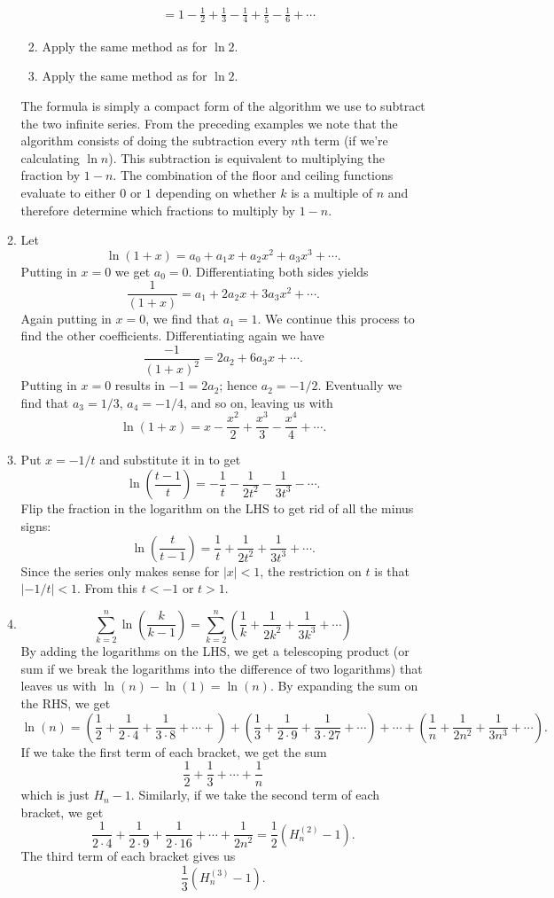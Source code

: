 \documentclass[a4paper,10pt]{article}
\begin{document}
\begin{enumerate}
\begin{enumerate}
\begin{enumerate}
\[\begin{split}
                &=1-\frac{1}{2}+\frac{1}{3}-\frac{1}{4}+\frac{1}{5}-\frac{1}{6}+\cdots
        \end{split}
      \]
    \item Apply the same method as for \(\ln2\).
    \item Apply the same method as for \(\ln2\).
    \end{enumerate}
    The formula is simply a compact form of the algorithm we use to subtract the two infinite series. From the preceding examples
    we note that the algorithm consists of doing the subtraction every \(n\)th term (if we're calculating \(\ln n\)). This subtraction
    is equivalent to multiplying the fraction by \(1-n\). The combination of the floor and ceiling functions evaluate to either \(0\) or \(1\)
    depending on whether \(k\) is a multiple of \(n\) and therefore determine which fractions to multiply by \(1-n\).
  \item Let \[\ln(1+x)=a_0+a_1x+a_2x^2+a_3x^3+\cdots.\]
    Putting in \(x=0\) we get \(a_0=0\). Differentiating both sides yields \[\frac{1}{(1+x)}=a_1+2a_2x+3a_3x^2+\cdots.\]
    Again putting in \(x=0\), we find that \(a_1=1\). We continue this process to find the other coefficients. Differentiating again
    we have \[\frac{-1}{(1+x)^2}=2a_2+6a_3x+\cdots.\] Putting in \(x=0\) results in \(-1=2a_2\); hence \(a_2=-1/2\). Eventually
    we find that \(a_3=1/3\), \(a_4=-1/4\), and so on, leaving us with \[\ln(1+x)=x-\frac{x^2}{2}+\frac{x^3}{3}-\frac{x^4}{4}+\cdots.\]
  \item Put \(x=-1/t\) and substitute it in to get
    \[\ln\left(\frac{t-1}{t}\right)=-\frac{1}{t}-\frac{1}{2t^2}-\frac{1}{3t^3}-\cdots.\]
      Flip the fraction in the logarithm on the LHS to get rid of all the minus signs:
      \[\ln\left(\frac{t}{t-1}\right)=\frac{1}{t}+\frac{1}{2t^2}+\frac{1}{3t^3}+\cdots.\]
      Since the series only makes sense for \(|x|<1\), the restriction on \(t\) is that \(|-1/t|<1\). From this \(t<-1\) or \(t>1\).
    \item \[ \sum_{k=2}^{n}\ln\left(\frac{k}{k-1}\right)=\sum_{k=2}^n\left(\frac{1}{k}+\frac{1}{2k^2}+\frac{1}{3k^3}+\cdots\right)\]
          By adding the logarithms on the LHS, we get a telescoping product (or sum if we break the logarithms into the difference of two logarithms)
          that leaves us with \(\ln(n)-\ln(1)=\ln(n)\). By expanding the sum on the RHS,  we get
          \[\ln(n)=\left(\frac{1}{2}+\frac{1}{2\cdot4}+\frac{1}{3\cdot8}+\cdots+\right)+\left(\frac{1}{3}+\frac{1}{2\cdot9}+\frac{1}{3\cdot27}+\cdots\right)+\cdots+\left(\frac{1}{n}+\frac{1}{2n^2}+\frac{1}{3n^3}+\cdots\right).\]
          If we take the first term of each bracket, we get the sum
          \[\frac{1}{2}+\frac{1}{3}+\cdots+\frac{1}{n}\] which is just
          \(H_n-1\). Similarly, if we take the second term of each bracket,
          we get \[\frac{1}{2\cdot 4}+\frac{1}{2\cdot9}+\frac{1}{2\cdot16}+\cdots+\frac{1}{2n^2}=\frac{1}{2}(H^{(2)}_n-1).\]
          The third term of each bracket gives us \[\frac{1}{3}(H^{(3)}_n-1).\]
          

\end{enumerate}
\end{enumerate}
\end{document}
